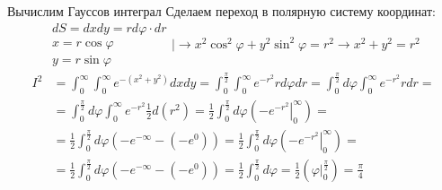 \begin{frame}{Вычислим Гауссов интеграл}
Сделаем переход в полярную систему координат:
$$
\begin{array}{l}
d S=d x d y=r d \varphi \cdot d r \\
x=r \cos \varphi \\
y=r \sin \varphi
\end{array} \mid \rightarrow x^{2} \cos ^{2} \varphi+y^{2} \sin ^{2} \varphi=r^{2} \rightarrow x^{2}+y^{2}=r^{2}
$$
\begin{align*}
I^{2}&=\int_{0}^{\infty} \int_{0}^{\infty} e^{-\left(x^{2}+y^{2}\right)} d x d y=\int_{0}^{\frac{\pi}{2}} \int_{0}^{\infty} e^{-r^{2}} r d \varphi d r=\int_{0}^{\frac{\pi}{2}} d \varphi \int_{0}^{\infty} e^{-r^{2}} r d r=\\
&=\int_{0}^{\frac{\pi}{2}} d \varphi \int_{0}^{\infty} e^{-r^{2}} \frac{1}{2} d\left(r^{2}\right)=\frac{1}{2} \int_{0}^{\frac{\pi}{2}} d \varphi\left(-\left.e^{-r^{2}}\right|_{0} ^{\infty}\right)=\\
&=\frac{1}{2} \int_{0}^{\frac{\pi}{2}} d \varphi\left(-e^{-\infty}-\left(-e^{0}\right)\right)=\frac{1}{2} \int_{0}^{\frac{\pi}{2}} d \varphi\left(-\left.e^{-r^{2}}\right|_{0} ^{\infty}\right)=\\
&=\frac{1}{2} \int_{0}^{\frac{\pi}{2}} d \varphi\left(-e^{-\infty}-\left(-e^{0}\right)\right)=\frac{1}{2} \int_{0}^{\frac{\pi}{2}} d \varphi=\frac{1}{2}\left(\left.\varphi\right|_{0} ^{\frac{\pi}{2}}\right)=\frac{\pi}{4}
\end{align*}
\end{frame}

